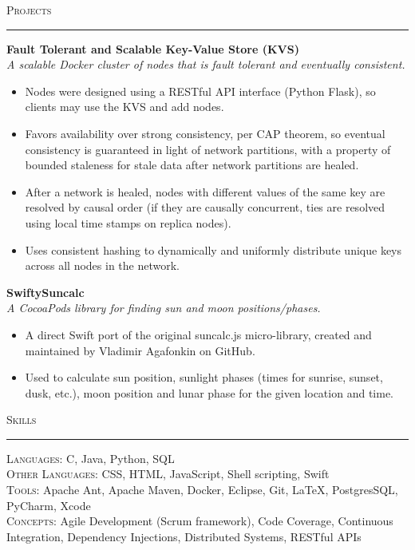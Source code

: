 \documentclass{res}
\begin{document}
\begin{resume}
\textsc{{\Large Projects}}
\vspace{0.5mm}
\hrule width18.5cm
\textbf{Fault Tolerant and Scalable Key-Value Store (KVS)}\\
\textit{A scalable Docker cluster of nodes that is fault tolerant and eventually consistent.}
	\vspace{2mm}
	\begin{itemize}
		\item Nodes were designed using a RESTful API interface (Python Flask), so clients may use the KVS and add nodes.
		\item Favors availability over strong consistency, per CAP theorem, so eventual consistency is guaranteed in light of network partitions, with a property of bounded staleness for stale data after network partitions are healed.
		\item After a network is healed, nodes with different values of the same key are resolved by causal order (if they are causally concurrent, ties are resolved using local time stamps on replica nodes).
		\item Uses consistent hashing to dynamically and uniformly distribute unique keys across all nodes in the network.
	\end{itemize}
\textbf{SwiftySuncalc}\\
\textit{A CocoaPods library for finding sun and moon positions/phases.}
	\vspace{2mm}
	\begin{itemize}
		\item A direct Swift port of the original suncalc.js micro-library, created and maintained by Vladimir Agafonkin on GitHub.
		\item Used to calculate sun position, sunlight phases (times for sunrise, sunset, dusk, etc.), moon position and lunar phase for the given location and time.
  \end{itemize}

\textsc{{\Large Skills}}
\vspace{0.5mm}
\hrule width18.5cm
	\textsc{Languages:} C, Java, Python, SQL\\[2mm]
	\textsc{Other Languages:} CSS, HTML, JavaScript, Shell scripting, Swift\\[2mm]
  \textsc{Tools:} Apache Ant, Apache Maven, Docker, Eclipse, Git, \LaTeX, PostgresSQL, PyCharm, Xcode\\[2mm]
	\textsc{Concepts:} Agile Development (Scrum framework), Code Coverage, Continuous Integration, Dependency Injections, Distributed Systems, RESTful APIs\\[0.5mm]
\vspace{-2mm}
\end{resume}
\end{document}
